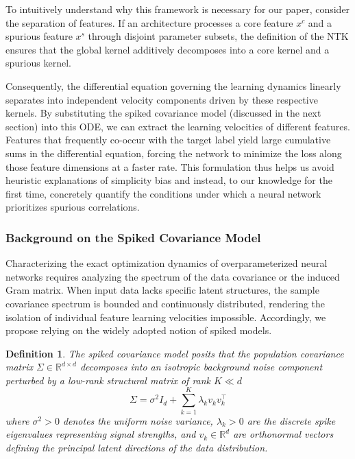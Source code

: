 \documentclass[letter,11pt]{article}
\newtheorem{definition}{Definition}
\begin{document}
To intuitively understand why this framework is necessary for our paper, consider the separation of features. If an architecture processes a core feature $x^c$ and a spurious feature $x^s$ through disjoint parameter subsets, the definition of the NTK ensures that the global kernel additively decomposes into a core kernel and a spurious kernel. 

Consequently, the differential equation governing the learning dynamics linearly separates into independent velocity components driven by these respective kernels. By substituting the spiked covariance model (discussed in the next section) into this ODE, we can extract the learning velocities of different features. Features that frequently co-occur with the target label yield large cumulative sums in the differential equation, forcing the network to minimize the loss along those feature dimensions at a faster rate. This formulation thus helps us avoid heuristic explanations of simplicity bias and instead, to our knowledge for the first time, concretely quantify the conditions under which a neural network prioritizes spurious correlations.

\subsubsection{Background on the Spiked Covariance Model}
Characterizing the exact optimization dynamics of overparameterized neural networks requires analyzing the spectrum of the data covariance or the induced Gram matrix. When input data lacks specific latent structures, the sample covariance spectrum is bounded and continuously distributed, rendering the isolation of individual feature learning velocities impossible. Accordingly, we propose relying on the widely adopted notion of spiked models.

\begin{definition}
The spiked covariance model posits that the population covariance matrix $\Sigma \in \mathbb{R}^{d \times d}$ decomposes into an isotropic background noise component perturbed by a low-rank structural matrix of rank $K \ll d$
\begin{equation}
\Sigma = \sigma^2 I_d + \sum_{k=1}^K \lambda_k v_k v_k^\top
\end{equation}
where $\sigma^2 > 0$ denotes the uniform noise variance, $\lambda_k > 0$ are the discrete spike eigenvalues representing signal strengths, and $v_k \in \mathbb{R}^d$ are orthonormal vectors defining the principal latent directions of the data distribution.
\end{definition}
\end{document}
